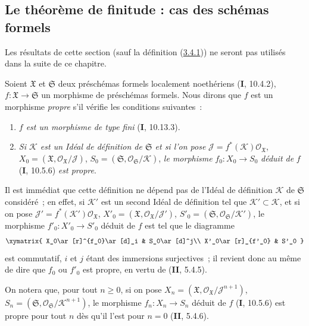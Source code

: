 \subsection{Le théorème de finitude : cas des schémas formels}
\label{subsection:III.3.4-fr}

Les résultats de cette section (sauf la définition
(\hyperref[III.3.4.1-fr]{3.4.1})) ne seront pas utilisés dans la suite de ce
chapitre.

\begin{env}[3.4.1]
\label{III.3.4.1-fr}
Soient $\mathfrak X$ et $\mathfrak S$ deux préschémas formels localement
noethériens (\textbf{I}, 10.4.2), $f:\mathfrak X\to\mathfrak S$ un morphisme de
préschémas formels. Nous dirons que $f$ est un morphisme \emph{propre} s'il
vérifie les conditions suivantes~:
\begin{enumerate}
\item[$1^\circ$] \emph{$f$ est un morphisme de type fini} (\textbf{I}, 10.13.3).
\item[$2^\circ$] \emph{Si $\mathcal K$ est un Idéal de définition de $\mathfrak S$
et si l'on pose}
$\mathcal J=f^*(\mathcal K)\mathcal O_{\mathfrak X}$,
$X_0=(\mathfrak X,\mathcal O_{\mathfrak X}/\mathcal J)$,
$S_0=(\mathfrak S,\mathcal O_{\mathfrak S}/\mathcal K)$, \emph{le morphisme}
$f_0:X_0\to S_0$ \emph{déduit de} $f$ (\textbf{I}, 10.5.6) \emph{est propre}.
\end{enumerate}

Il est immédiat que cette définition ne dépend pas de l'Idéal de définition
$\mathcal K$ de $\mathfrak S$ considéré~; en effet, si $\mathcal K'$ est un
second Idéal de définition tel que $\mathcal K'\subset\mathcal K$, et si on
pose $\mathcal J'=f^*(\mathcal K')\mathcal O_{\mathfrak X}$,
$X'_0=(\mathfrak X,\mathcal O_{\mathfrak X}/\mathcal J')$,
$S'_0=(\mathfrak S,\mathcal O_{\mathfrak S}/\mathcal K')$, le morphisme
$f'_0:X'_0\to S'_0$ déduit de $f$ est tel que le diagramme
\[
\xymatrix{
X_0\ar[r]^{f_0}\ar[d]_i & S_0\ar[d]^j\\
X'_0\ar[r]_{f'_0} & S'_0
}
\]
est commutatif, $i$ et $j$ étant des immersions surjectives~; il revient donc
au même de dire que $f_0$ ou $f'_0$ est propre, en vertu de (\textbf{II}, 5.4.5).

On notera que, pour tout $n\geq0$, si on pose
$X_n=(\mathfrak X,\mathcal O_{\mathfrak X}/\mathcal J^{n+1})$,
$S_n=(\mathfrak S,\mathcal O_{\mathfrak S}/\mathcal K^{n+1})$, le morphisme
$f_n:X_n\to S_n$ déduit de $f$ (\textbf{I}, 10.5.6) est propre pour tout $n$ dès qu'il
l'est pour $n=0$ (\textbf{II}, 5.4.6).


\end{env}
